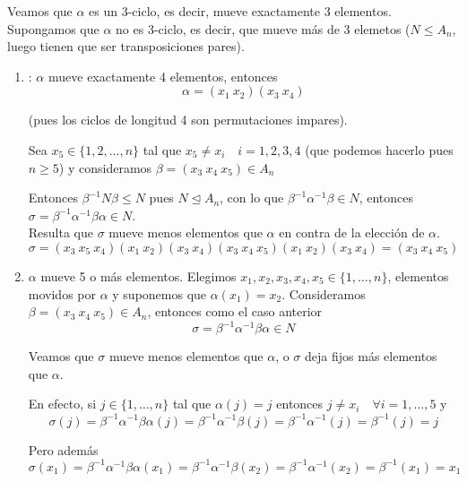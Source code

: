 \documentclass{article}
\begin{document}
Veamos que $\alpha$ es un 3-ciclo, es decir, mueve exactamente 3 elementos. Supongamos que $\alpha$ no es 3-ciclo, es decir, que mueve más de 3 elemetos ($N\leq A_n$, luego tienen que ser transposiciones pares).

\begin{enumerate}[\bfseries C{a}so 1]
\item : $\alpha$ mueve exactamente 4 elementos, entonces
\begin{equation*}
\alpha=(x_1\:x_2)(x_3\:x_4)
\end{equation*}

(pues los ciclos de longitud 4 son permutaciones impares).

Sea $x_5\in \{1,2,\ldots,n\}$ tal que $x_5 \neq x_i \quad i=1,2,3,4$ (que podemos hacerlo pues $n\geq 5$) y consideramos $\beta=(x_3\:x_4\:x_5)\in A_n$

Entonces $\beta^{-1}N\beta \leq N$ pues $N\unlhd A_n$, con lo que $\beta^{-1}\alpha^{-1}\beta \in N$, entonces $\sigma=\beta^{-1}\alpha^{-1}\beta\alpha\in N$. \\

Resulta que $\sigma$ mueve menos elementos que $\alpha$ en contra de la elección de $\alpha$.
\begin{equation*}
\sigma=(x_3\:x_5\:x_4)(x_1\:x_2)(x_3\:x_4)(x_3\:x_4\:x_5)(x_1\:x_2)(x_3\:x_4)=(x_3\:x_4\:x_5)
\end{equation*}

\item $\alpha$ mueve 5 o más elementos. Elegimos $x_1,x_2,x_3,x_4,x_5\in\{1,\ldots,n\}$, elementos movidos por $\alpha$ y suponemos que $\alpha(x_1)=x_2$. Consideramos $\beta=(x_3\:x_4\:x_5)\in A_n$, entonces como el caso anterior
\begin{equation*}
\sigma=\beta^{-1}\alpha^{-1}\beta\alpha\in N
\end{equation*}

Veamos que $\sigma$ mueve menos elementos que $\alpha$, o $\sigma$ deja fijos más elementos que $\alpha$. 

En efecto, si $j\in\{1,\ldots,n\}$ tal que $\alpha(j)=j$ entonces $j\neq x_i\quad\forall i=1,\ldots,5$ y 
\begin{equation*}
\sigma(j)=\beta^{-1}\alpha^{-1}\beta\alpha(j)=\beta^{-1}\alpha^{-1}\beta(j)=\beta^{-1}\alpha^{-1}(j)=\beta^{-1}(j)=j
\end{equation*}

Pero además
\begin{equation*}
\sigma(x_1)=\beta^{-1}\alpha^{-1}\beta\alpha(x_1)=\beta^{-1}\alpha^{-1}\beta(x_2)=\beta^{-1}\alpha^{-1}(x_2)=\beta^{-1}(x_1)=x_1
\end{equation*}


\end{enumerate}
\end{document}
